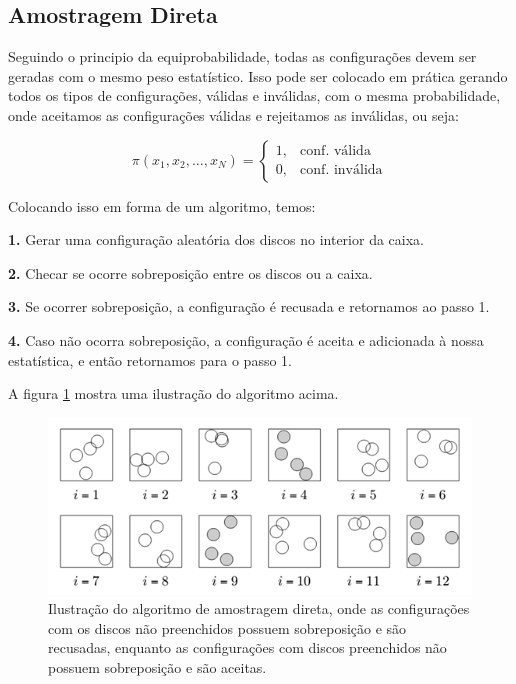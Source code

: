 \documentclass[%
reprint,
amsmath,amssymb,
aps,
12pt
]{revtex4-1}
\begin{document}
\subsection{Amostragem Direta}
 
Seguindo o principio da equiprobabilidade, todas as configurações devem ser geradas com o mesmo peso estatístico. Isso pode ser colocado em prática gerando todos os tipos de configurações, válidas e inválidas, com o mesma probabilidade, onde aceitamos as configurações válidas e rejeitamos as inválidas, ou seja:

\begin{equation}
\pi(x_1,x_2 ,...,x_N) = \left \{ \begin{matrix} 1, & \mbox{conf. válida} \\ 0, & \mbox{conf. inválida} \end{matrix} \right.
\end{equation}

Colocando isso em forma de um algoritmo, temos:

\textbf{1.} Gerar uma configuração aleatória dos discos no interior da caixa.

\textbf{2.} Checar se ocorre sobreposição entre os discos ou a caixa.

\textbf{3.} Se ocorrer sobreposição, a configuração é recusada e retornamos ao passo 1.

\textbf{4.} Caso não ocorra sobreposição, a configuração é aceita e adicionada à nossa estatística, e então retornamos para o passo 1.

A figura \ref{mcd} mostra uma ilustração do algoritmo acima.

\begin{figure}[!h]
	\centering
	\includegraphics[scale=0.6]{mcd.png}
	\caption{Ilustração do algoritmo de amostragem direta, onde as configurações com os discos não preenchidos possuem sobreposição e são recusadas, enquanto as configurações com discos preenchidos não possuem sobreposição e são aceitas.
		\label{mcd}}
\end{figure}
\end{document}
